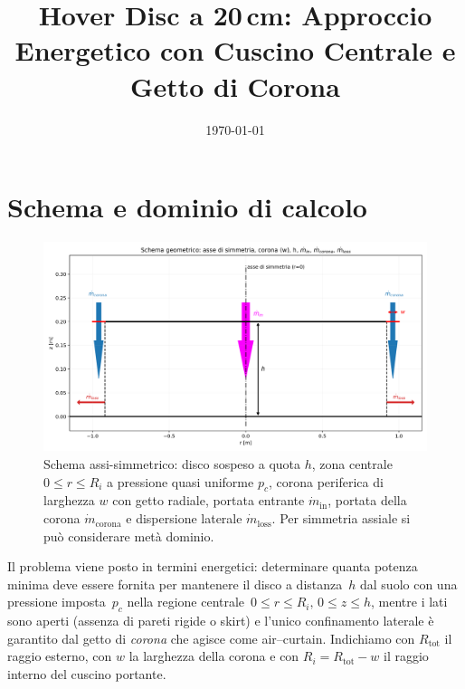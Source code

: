 \documentclass[11pt,a4paper]{article}
\title{Hover Disc a 20\,cm: Approccio Energetico con Cuscino Centrale e Getto di Corona}
\author{}
\date{\today}
\begin{document}
\maketitle

\section{Schema e dominio di calcolo}

\begin{figure}[ht]
  \centering
  \includegraphics[width=0.8\linewidth]{./figures/schema_geometry.png}
  \caption{Schema assi-simmetrico: disco sospeso a quota \texorpdfstring{$h$}{h}, zona centrale
  \texorpdfstring{$0\le r\le R_i$}{0≤r≤Ri} a pressione quasi uniforme \texorpdfstring{$p_c$}{pc}, corona periferica di larghezza
  \texorpdfstring{$w$}{w} con getto radiale, portata entrante \texorpdfstring{$\dot{m}_{\mathrm{in}}$}{mdot\_in}, portata della corona
  \texorpdfstring{$\dot{m}_{\mathrm{corona}}$}{mdot\_corona} e dispersione laterale
  \texorpdfstring{$\dot{m}_{\mathrm{loss}}$}{mdot\_loss}. Per simmetria assiale si può considerare metà dominio.}
  \label{fig:schemageo}
\end{figure}

Il problema viene posto in termini energetici: determinare quanta potenza minima deve essere fornita per mantenere il disco a distanza \(\,h\) dal suolo con una pressione imposta \(\,p_c\) nella regione centrale
\(\,0\le r\le R_i,\,0\le z\le h\), mentre i lati sono aperti (assenza di pareti rigide o skirt) e l'unico confinamento laterale è garantito dal getto di \emph{corona} che agisce come air--curtain. Indichiamo con \(R_{\mathrm{tot}}\) il raggio esterno, con \(w\) la larghezza della corona e con \(R_i=R_{\mathrm{tot}}-w\) il raggio interno del cuscino portante.
\end{document}
